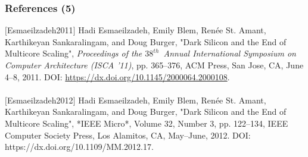 %
%
%
%
%
%
%
%
%
%
%
%
%
%
\begin{frame}
	\frametitle{References (5)}
%


	$[$Esmaeilzadeh2011$]$ Hadi Esmaeilzadeh, Emily Blem, Ren{\'{e}}e {St. Amant}, Karthikeyan Sankaralingam, and Doug Burger, "Dark Silicon and the End of Multicore Scaling", {\it Proceedings of the $38^{th}$\ Annual International Symposium on Computer Architecture ({ISCA '11})}, pp. 365--376, {ACM} Press, San Jose, {CA}, June 4--8, 2011. DOI: \url{https://dx.doi.org/10.1145/2000064.2000108}. \\
	\ \\
	$[$Esmaeilzadeh2012$]$ Hadi Esmaeilzadeh, Emily Blem, Ren{\'{e}}e {St. Amant}, Karthikeyan Sankaralingam, and Doug Burger, "Dark Silicon and the End of Multicore Scaling", *{IEEE} Micro*, Volume 32, Number 3, pp. 122--134, {IEEE} Computer Society Press, Los Alamitos, {CA}, May--June, 2012. DOI: https://dx.doi.org/10.1109/MM.2012.17.
%
%
%







\end{frame}
